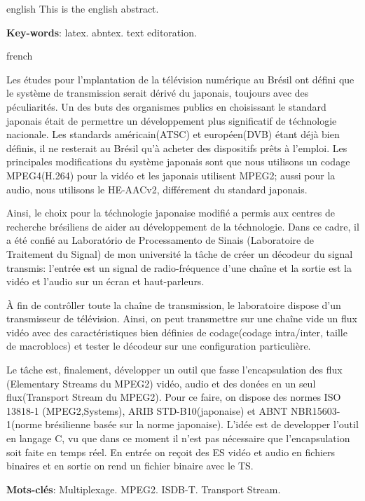 \documentclass[
	12pt,				%
	openright,			%
	twoside,			%
	a4paper,			%
	english,			%
	french,				%
	brazil				%
	]{abntex2}
\begin{document}
\begin{resumo}[Abstract]
 \begin{otherlanguage*}{english}
   This is the english abstract.

   \vspace{\onelineskip}
 
   \noindent 
   \textbf{Key-words}: latex. abntex. text editoration.
 \end{otherlanguage*}
\end{resumo}

\begin{resumo}[Résumé]
 \begin{otherlanguage*}{french}
 
 Les études pour l'mplantation de la télévision numérique au Brésil ont défini que le système de transmission serait dérivé du japonais, toujours avec des péculiarités. Un des buts des organismes publics en choisissant le standard japonais était de permettre un développement plus significatif de téchnologie nacionale. Les standards américain(ATSC) et européen(DVB) étant déjà bien définis, il ne resterait au Brésil qu'à acheter des dispositifs prêts à l'emploi. Les principales modifications du système japonais sont que nous utilisons un codage MPEG4(H.264) pour la vidéo et les japonais utilisent MPEG2; aussi pour la audio, nous utilisons le HE-AACv2, différement du standard japonais.

Ainsi, le choix pour la téchnologie japonaise modifié a permis aux centres de recherche brésiliens de aider au développement de la téchnologie. Dans ce cadre, il a été confié au Laboratório de Processamento de Sinais (Laboratoire de Traitement du Signal) de mon université la tâche de créer un décodeur du signal transmis: l'entrée est un signal de radio-fréquence d'une chaîne et la sortie est la vidéo et l'audio sur un écran et haut-parleurs.

À fin de contrôller toute la chaîne de transmission, le laboratoire dispose d'un transmisseur de télévision. Ainsi, on peut transmettre sur une chaîne vide un flux vidéo avec des caractéristiques bien définies de codage(codage intra/inter, taille de macroblocs) et tester le décodeur sur une configuration particulière.

Le tâche est, finalement, développer un outil que fasse l'encapsulation des flux (Elementary Streams du MPEG2) vidéo, audio et des donées en un seul flux(Transport Stream du MPEG2). Pour ce faire, on dispose des normes ISO 13818-1 (MPEG2,Systems), ARIB STD-B10(japonaise) et ABNT NBR15603-1(norme brésilienne basée sur la norme japonaise). L'idée est de developper l'outil en langage C, vu que dans ce moment il n'est pas nécessaire que l'encapsulation soit faite en temps réel. En entrée on reçoit des ES vidéo et audio en fichiers binaires et en sortie on rend un fichier binaire avec le TS.

   \textbf{Mots-clés}: Multiplexage. MPEG2. ISDB-T. Transport Stream.
 \end{otherlanguage*}
\end{resumo}
\end{document}
